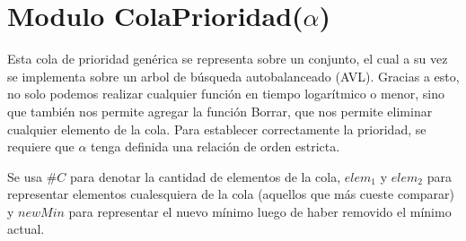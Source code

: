 \section{Modulo ColaPrioridad(\texorpdfstring{$\alpha$}{α})}

Esta cola de prioridad genérica se representa sobre un conjunto, el cual a su vez se implementa sobre un arbol de búsqueda autobalanceado (AVL). Gracias a esto, no solo podemos realizar cualquier función en tiempo logarítmico o menor, sino que también nos permite agregar la función Borrar, que nos permite eliminar cualquier elemento de la cola. Para establecer correctamente la prioridad, se requiere que $\alpha$ tenga definida una relación de orden estricta.

Se usa $\#C$ para denotar la cantidad de elementos de la cola, $elem_1$ y $elem_2$ para representar elementos cualesquiera de la cola (aquellos que más cueste comparar) y $newMin$ para representar el nuevo mínimo luego de haber removido el mínimo actual.

